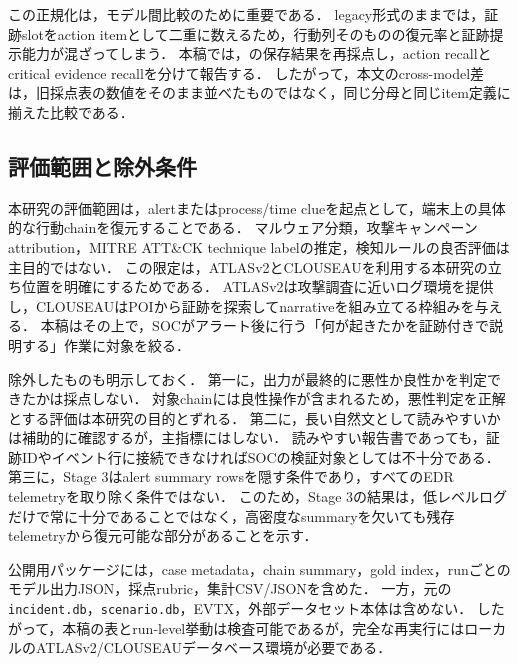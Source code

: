 この正規化は，モデル間比較のために重要である．
legacy形式のままでは，証跡slotをaction itemとして二重に数えるため，行動列そのものの復元率と証跡提示能力が混ざってしまう．
本稿では，の保存結果を再採点し，action recallとcritical evidence recallを分けて報告する．
したがって，本文のcross-model差は，旧採点表の数値をそのまま並べたものではなく，同じ分母と同じitem定義に揃えた比較である．

\subsection{評価範囲と除外条件}

本研究の評価範囲は，alertまたはprocess/time clueを起点として，端末上の具体的な行動chainを復元することである．
マルウェア分類，攻撃キャンペーン attribution，MITRE ATT\&CK technique labelの推定，検知ルールの良否評価は主目的ではない．
この限定は，ATLASv2とCLOUSEAUを利用する本研究の立ち位置を明確にするためである．
ATLASv2は攻撃調査に近いログ環境を提供し，CLOUSEAUはPOIから証跡を探索してnarrativeを組み立てる枠組みを与える．
本稿はその上で，SOCがアラート後に行う「何が起きたかを証跡付きで説明する」作業に対象を絞る．

除外したものも明示しておく．
第一に，出力が最終的に悪性か良性かを判定できたかは採点しない．
対象chainには良性操作が含まれるため，悪性判定を正解とする評価は本研究の目的とずれる．
第二に，長い自然文として読みやすいかは補助的に確認するが，主指標にはしない．
読みやすい報告書であっても，証跡IDやイベント行に接続できなければSOCの検証対象としては不十分である．
第三に，Stage 3はalert summary rowsを隠す条件であり，すべてのEDR telemetryを取り除く条件ではない．
このため，Stage 3の結果は，低レベルログだけで常に十分であることではなく，高密度なsummaryを欠いても残存telemetryから復元可能な部分があることを示す．

公開用パッケージには，case metadata，chain summary，gold index，runごとのモデル出力JSON，採点rubric，集計CSV/JSONを含めた．
一方，元の\texttt{incident.db}，\texttt{scenario.db}，EVTX，外部データセット本体は含めない．
したがって，本稿の表とrun-level挙動は検査可能であるが，完全な再実行にはローカルのATLASv2/CLOUSEAUデータベース環境が必要である．


